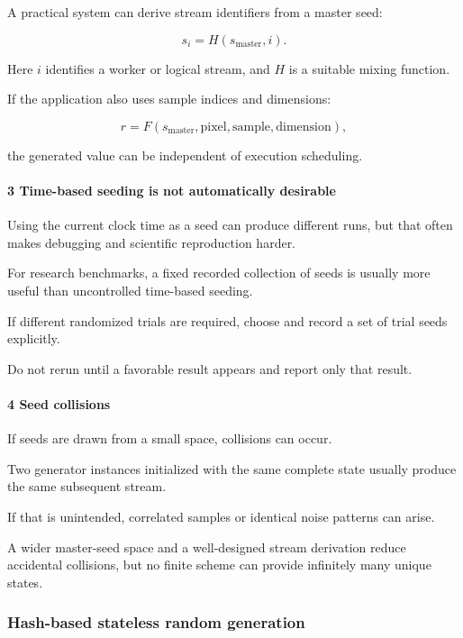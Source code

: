A practical system can derive stream identifiers from a master seed:

\[
 s_i=H(s_{\mathrm{master}},i).
\]

Here \(i\) identifies a worker or logical stream, and \(H\) is a suitable mixing function.

If the application also uses sample indices and dimensions:

\[
 r=F(s_{\mathrm{master}},\text{pixel},\text{sample},\text{dimension}),
\]

the generated value can be independent of execution scheduling.

\paragraph{3 Time-based seeding is not automatically desirable}\label{time-based-seeding-is-not-automatically-desirable}

Using the current clock time as a seed can produce different runs, but that often makes debugging and scientific reproduction harder.

For research benchmarks, a fixed recorded collection of seeds is usually more useful than uncontrolled time-based seeding.

If different randomized trials are required, choose and record a set of trial seeds explicitly.

Do not rerun until a favorable result appears and report only that result.

\paragraph{4 Seed collisions}\label{seed-collisions}

If seeds are drawn from a small space, collisions can occur.

Two generator instances initialized with the same complete state usually produce the same subsequent stream.

If that is unintended, correlated samples or identical noise patterns can arise.

A wider master-seed space and a well-designed stream derivation reduce accidental collisions, but no finite scheme can provide infinitely many unique states.

\subsubsection{Hash-based stateless random generation}\label{hash-based-stateless-random-generation}

